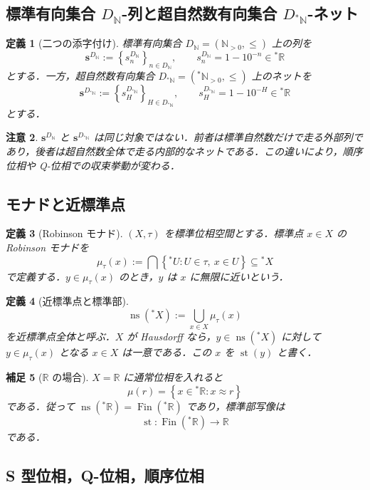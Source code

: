 \documentclass[a4paper,11pt]{ltjsarticle}
\theoremstyle{jpdef}
\newtheorem{definition}{定義}[section]
\newtheorem{remark}[definition]{補足}
\newtheorem{warning}[definition]{注意}
\theoremstyle{jpthm}
\newcommand{\N}{\mathbb{N}}
\newcommand{\R}{\mathbb{R}}
\newcommand{\st}{\operatorname{st}}
\newcommand{\Fin}{\operatorname{Fin}}
\newcommand{\Ns}{\N_{>0}}
\newcommand{\DN}{D_{\N}}
\newcommand{\DStarN}{D_{{}^{\ast}\N}}
\newcommand{\set}[1]{\left\{#1\right\}}
\newcommand{\seq}[2]{\left\{#1\right\}_{#2}}
\newcommand{\ulim}[1]{{}^{\ast}#1}
\newcommand{\near}{\operatorname{ns}}
\begin{document}
\subsection{標準有向集合 \(\DN\)-列と超自然数有向集合 \(\DStarN\)-ネット}

\begin{definition}[二つの添字付け]
標準有向集合 \(\DN=(\Ns,\le)\) 上の列を
\[
  \mathbf s^{\DN}:=\seq{s^{\DN}_n}{n\in\DN},
  \qquad
  s^{\DN}_n=1-10^{-n}\in\ulim\R
\]
とする．一方，超自然数有向集合 \(\DStarN=(\ulim\Ns,\le)\) 上のネットを
\[
  \mathbf s^{\DStarN}:=\seq{s^{\DStarN}_H}{H\in\DStarN},
  \qquad
  s^{\DStarN}_H=1-10^{-H}\in\ulim\R
\]
とする．
\end{definition}

\begin{warning}
\(\mathbf s^{\DN}\) と \(\mathbf s^{\DStarN}\) は同じ対象ではない．前者は標準自然数だけで走る外部列であり，後者は超自然数全体で走る内部的なネットである．この違いにより，順序位相や Q-位相での収束挙動が変わる．
\end{warning}

\subsection{モナドと近標準点}

\begin{definition}[Robinson モナド]
\((X,\tau)\) を標準位相空間とする．標準点 \(x\in X\) の Robinson モナドを
\[
  \mu_\tau(x):=\bigcap\set{\ulim U:U\in\tau,\ x\in U}\subseteq\ulim X
\]
で定義する．\(y\in\mu_\tau(x)\) のとき，\(y\) は \(x\) に無限に近いという．
\end{definition}

\begin{definition}[近標準点と標準部]
\[
  \near(\ulim X):=\bigcup_{x\in X}\mu_\tau(x)
\]
を近標準点全体と呼ぶ．\(X\) が Hausdorff なら，\(y\in\near(\ulim X)\) に対して \(y\in\mu_\tau(x)\) となる \(x\in X\) は一意である．この \(x\) を \(\st(y)\) と書く．
\end{definition}

\begin{remark}[\(\R\) の場合]
\(X=\R\) に通常位相を入れると
\[
  \mu(r)=\set{x\in\ulim\R:x\approx r}
\]
である．従って \(\near(\ulim\R)=\Fin(\ulim\R)\) であり，標準部写像は
\[
  \st:\Fin(\ulim\R)\to\R
\]
である．
\end{remark}

\subsection{S 型位相，Q-位相，順序位相}
\end{document}
